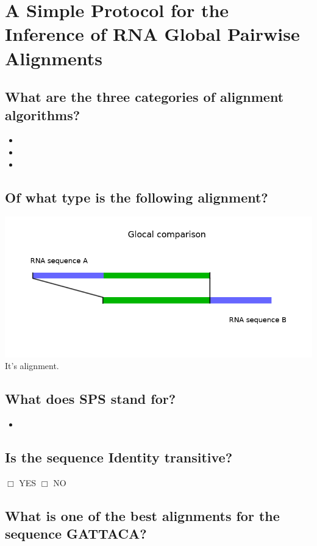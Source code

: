\documentclass{scrartcl}
\begin{document}
\section*{A Simple Protocol for the Inference of RNA Global Pairwise Alignments}

\vspace{0.5cm}

\subsection*{What are the three categories of alignment algorithms?}
\begin{itemize}
\item
\item
\item
\end{itemize}

\vspace{0.5cm}

\subsection*{Of what type is the following alignment?}
\includegraphics[width=\textwidth, clip = true, trim = 0mm 0mm 0mm 26mm]{proseminar/images/rna_comparison_glocal}
It's \underline{\hspace{4cm}} alignment.


\vspace{0.5cm}

\subsection*{What does SPS stand for?}
\begin{itemize}
\item
\end{itemize}

\vspace{0.5cm}

\subsection*{Is the sequence Identity transitive?}
\hspace{2cm} $\Box$ YES \hspace{1cm} $\Box$ NO

\vspace{1cm}

\subsection*{What is one of the best alignments for the sequence GATTACA?}
\end{document}
